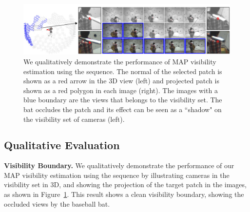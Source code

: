 \begin{figure}[th]
	\centering       
	\includegraphics[width=\textwidth]{figures/VisibilityQualitativeFull_small2}
	\caption{We qualitatively demonstrate the performance of MAP visibility estimation using the  sequence. The normal of the selected patch is shown as a red arrow in the 3D view (left) and projected patch is shown as a red polygon in each image (right). The images with a blue boundary are the views that belongs to the visibility set. The bat occludes the patch and its effect can be seen as a ``shadow" on the visibility set of cameras (left).}
	\label{Fig:VisQ}
\end{figure}


\subsection{Qualitative Evaluation}
\noindent \textbf{Visibility Boundary.} We qualitatively demonstrate the performance of our MAP visibility estimation using the  sequence by illustrating cameras in the visibility set in 3D, and showing the projection of the target patch in the images, as shown in Figure~\ref{Fig:VisQ}. This result shows a clean visibility boundary, showing the occluded views by the baseball bat.  

